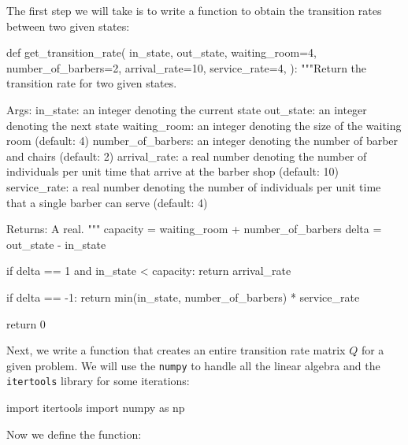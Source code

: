 The first step we will take is to write a function to obtain the transition
rates between two given states:


\begin{pyin}
def get_transition_rate(
    in_state,
    out_state,
    waiting_room=4,
    number_of_barbers=2,
    arrival_rate=10,
    service_rate=4,
):
    """Return the transition rate for two given states.

    Args:
        in_state: an integer denoting the current state
        out_state: an integer denoting the next state
        waiting_room: an integer denoting the size of the
                      waiting room (default: 4)
        number_of_barbers: an integer denoting the number of
                           barber and chairs (default: 2)
        arrival_rate: a real number denoting the number of
                      individuals per unit time that arrive at
                      the barber shop (default: 10)
        service_rate: a real number denoting the number of
                      individuals per unit time that a single
                      barber can serve (default: 4)

    Returns:
        A real.
    """
    capacity = waiting_room + number_of_barbers
    delta = out_state - in_state

    if delta == 1 and in_state < capacity:
        return arrival_rate

    if delta == -1:
        return min(in_state, number_of_barbers) * service_rate

    return 0
\end{pyin}

Next, we write a function that creates an entire transition rate matrix \(Q\)
for a given problem. We will use the \texttt{numpy} to handle all
the linear algebra and the \texttt{itertools} library for some
iterations:

\begin{pyin}
import itertools
import numpy as np
\end{pyin}

Now we define the function:

